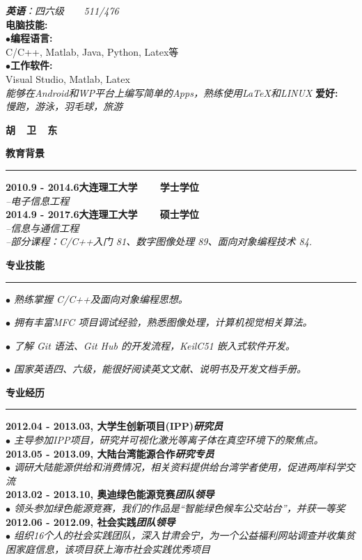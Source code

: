 \documentclass[a4paper,12pt,final]{memoir}
\newcommand{\myThemeColor}{RoyalBlue}
\newcommand{\SmallSep}{\vspace{0.9em}}
\newcommand{\CVSection}[1]
	{\Large\textbf{#1}\par
	\vspace{0.2cm}\normalsize\normalfont}
\newcommand{\CVItem}[1]
	{\textbf{\color{\myThemeColor} #1}}
\begin{document}
\begin{CJK*}{UTF8}{gbsn}
\begin{flushright}
	\textit{\textbf{英语}：四六级~~~~511/476}\\
	\SmallSep
\SmallSep
\SmallSep
	\CVItem{{\large 电脑技能:}}\\
    \SmallSep
	$\bullet$\textbf{编程语言:}\\ C/C++, Matlab, Java, Python, Latex等\\
	\SmallSep
    $\bullet$\textbf{工作软件:}\\ Visual Studio, Matlab, Latex\\
	\SmallSep
	\textit{能够在Android和WP平台上编写简单的Apps，熟练使用\LaTeX 和LINUX}
	\SmallSep
\SmallSep
\SmallSep
	\CVItem{{\large 爱好:}}\\
\SmallSep
	\textit{慢跑，游泳，羽毛球，旅游 }
	\SmallSep
\end{flushright}\normalsize
\framebreak


\Huge\bfseries {\color{\myThemeColor} 胡~~卫~~东}\\
\normalsize\normalfont

\CVSection{教育背景}
\hrule
\SmallSep
\CVItem{2010.9 - 2014.6\hfill\textsc{大连理工大学~~~~学士学位}}\\
\textit{--电子信息工程}\\
\CVItem{2014.9 - 2017.6\hfill\textsc{大连理工大学~~~~硕士学位}}\\
\textit{--信息与通信工程}\\
\textit{--部分课程：C/C++入门 81、数字图像处理 89、面向对象编程技术 84. }

\CVSection{专业技能}
\hrule
\SmallSep

\textit{$\bullet$ 熟练掌握 C/C++及面向对象编程思想。}

\textit{$\bullet$ 拥有丰富MFC 项目调试经验，熟悉图像处理，计算机视觉相关算法。}

\textit{$\bullet$ 了解 Git 语法、Git Hub 的开发流程，KeilC51 嵌入式软件开发。 }

\textit{$\bullet$ 国家英语四、六级，能很好阅读英文文献、说明书及开发文档手册。}

\CVSection{专业经历}
\hrule
\SmallSep
\CVItem{2012.04 - 2013.03, 大学生创新项目(IPP)\hfill\emph{研究员}}\\
\textit{$\bullet$ 主导参加IPP项目，研究并可视化激光等离子体在真空环境下的聚焦点。}
\\
\CVItem{2013.05 - 2013.09, 大陆台湾能源合作\hfill\emph{研究专员}}\\
\textit{$\bullet$ 调研大陆能源供给和消费情况，相关资料提供给台湾学者使用，促进两岸科学交流}
\\
\CVItem{2013.02 - 2013.10, 奥迪绿色能源竞赛\hfill\emph{团队领导}}\\
\textit{$\bullet$ 领头参加绿色能源竞赛，我们的作品是“智能绿色候车公交站台”，并获一等奖}
\\
\CVItem{2012.06 - 2012.09, 社会实践\hfill\emph{团队领导}}\\
\textit{$\bullet$ 组织16个人的社会实践团队，深入甘肃会宁，为一个公益福利网站调查并收集贫困家庭信息，该项目获上海市社会实践优秀项目}


\end{CJK*}
\end{document}
